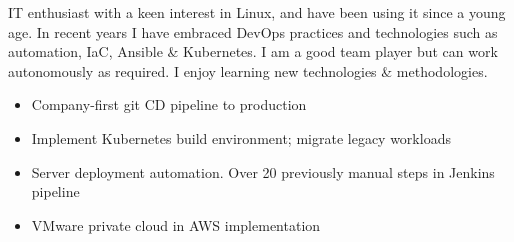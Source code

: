 \documentclass[9pt]{developercv} %
\begin{document}


\begin{minipage}[t]{0.4\textwidth} %
	\vspace{-\baselineskip} %
	
  IT enthusiast with a keen interest in Linux, and have been using it since a young age. In recent years I have embraced DevOps practices and technologies such as automation, IaC, Ansible \& Kubernetes. I am a good team player but can work autonomously as required. I enjoy learning new technologies \& methodologies.
\end{minipage}
\hfill %
\begin{minipage}[t]{0.5\textwidth} %
	\vspace{-\baselineskip} %
	\begin{barchart}{5.5}
	\end{barchart}
\end{minipage}


\begin{minipage}[t]{0.5\textwidth}
\begin{itemize}
  \item Company-first git CD pipeline to production
  \item Implement Kubernetes build environment; migrate legacy workloads
\end{itemize}
\end{minipage}
\begin{minipage}[t]{0.5\textwidth}
\begin{itemize}
  \item Server deployment automation. Over 20 previously manual steps in Jenkins pipeline
  \item VMware private cloud in AWS implementation
\end{itemize}
\end{minipage}
\end{document}
